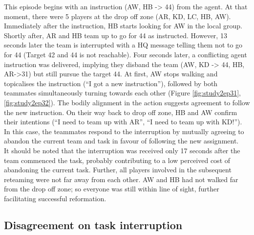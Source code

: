 This episode begins with an instruction (AW, HB -> 44) from the agent. At that moment, there were 5 players at the drop off zone (AR, KD, LC, HB, AW). Immediately after the instruction, HB starts looking for AW in the local group. Shortly after, AR and HB team up to go for 44 as instructed.  However, 13 seconds later the team is interrupted with a HQ message telling them not to go for 44 (Target 42 and 44 is not reachable). Four seconds later, a conflicting agent instruction was delivered, implying they disband the team (AW, KD -> 44, HB, AR->31) but still pursue the target 44. At first, AW stops walking and topicalises the instruction (``I got a new instruction''), followed by both teammates simultaneously turning towards each other (Figure \ref{fig:study2ep31}, \ref{fig:study2ep32}). The bodily alignment in the action suggests agreement to follow the new instruction. On their way back to drop off zone, HB and AW confirm their intentions (``I need to team up with AR'', ``I need to team up with KD!''). In this case, the teammates respond to the interruption by mutually agreeing to abandon the current team and task in favour of following the new assignment. \\

It should be noted that the interruption was received only 17 seconds after the team commenced the task, probably contributing to a low perceived cost of abandoning the current task. Further, all players involved in the subsequent reteaming were not far away from each other. AW and HB had not walked far from the drop off zone; so everyone was still within line of sight, further facilitating successful reformation. \\

\subsection{Disagreement on task interruption}

